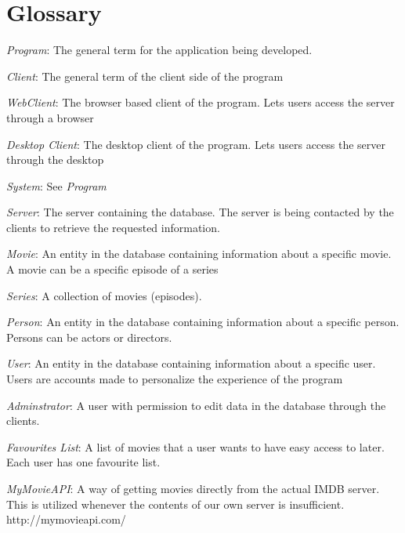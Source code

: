 \section{Glossary}
\label{sec:glossary}

\emph{Program}: The general term for the application being developed.

\emph{Client}: The general term of the client side of the program

\emph{WebClient}: The browser based client of the program. Lets users access the server through a browser

\emph{Desktop Client}: The desktop client of the program. Lets users access the server through the desktop

\emph{System}: See \emph{Program}

\emph{Server}: The server containing the database. The server is being contacted by the clients to retrieve the requested information.

\emph{Movie}: An entity in the database containing information about a specific movie. A movie can be a specific episode of a series

\emph{Series}: A collection of movies (episodes).

\emph{Person}: An entity in the database containing information about a specific person. Persons can be actors or directors.

\emph{User}: An entity in the database containing information about a specific user. Users are accounts made to personalize the experience of the program

\emph{Adminstrator}: A user with permission to edit data in the database through the clients.

\emph{Favourites List}: A list of movies that a user wants to have easy access to later. Each user has one favourite list.

\emph{MyMovieAPI}: A way of getting movies directly from the actual IMDB server. This is utilized whenever the contents of our own server is insufficient. 
\\http://mymovieapi.com/
